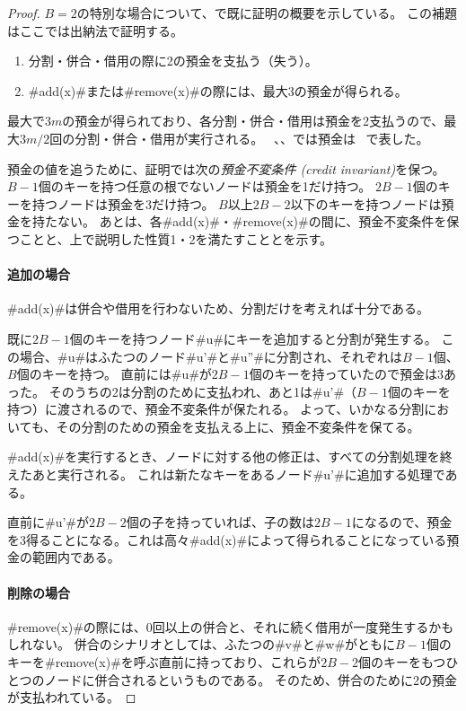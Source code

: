 \begin{proof}
   $B=2$の特別な場合について、で既に証明の概要を示している。
   この補題はここでは出納法で証明する。
  \begin{enumerate}
    \item 分割・併合・借用の際に2の預金を支払う（失う）。
    \item #add(x)#または#remove(x)#の際には、最大3の預金が得られる。
  \end{enumerate}
  最大で$3m$の預金が得られており、各分割・併合・借用は預金を2支払うので、最大$3m/2$回の分割・併合・借用が実行される。
  ~、、では預金は \cent\ で表した。

  預金の値を追うために、証明では次の\emph{預金不変条件 (credit invariant)}を保つ。
  $B-1$個のキーを持つ任意の根でないノードは預金を1だけ持つ。
  $2B-1$個のキーを持つノードは預金を3だけ持つ。
  $B$以上$2B-2$以下のキーを持つノードは預金を持たない。
  あとは、各#add(x)#・#remove(x)#の間に、預金不変条件を保つことと、上で説明した性質1・2を満たすこととを示す。

  \paragraph{追加の場合}
  #add(x)#は併合や借用を行わないため、分割だけを考えれば十分である。

  既に$2B-1$個のキーを持つノード#u#にキーを追加すると分割が発生する。
  この場合、#u#はふたつのノード#u'#と#u''#に分割され、それぞれは$B-1$個、$B$個のキーを持つ。
  直前には#u#が$2B-1$個のキーを持っていたので預金は3あった。
  そのうちの2は分割のために支払われ、あと1は#u'#（$B-1$個のキーを持つ）に渡されるので、預金不変条件が保たれる。
  よって、いかなる分割においても、その分割のための預金を支払える上に、預金不変条件を保てる。

  #add(x)#を実行するとき、ノードに対する他の修正は、すべての分割処理を終えたあと実行される。
  これは新たなキーをあるノード#u'#に追加する処理である。

  直前に#u'#が$2B-2$個の子を持っていれば、子の数は$2B-1$になるので、預金を3得ることになる。これは高々#add(x)#によって得られることになっている預金の範囲内である。

  \paragraph{削除の場合}
  #remove(x)#の際には、0回以上の併合と、それに続く借用が一度発生するかもしれない。
  併合のシナリオとしては、ふたつの#v#と#w#がともに$B-1$個のキーを#remove(x)#を呼ぶ直前に持っており、これらが$2B-2$個のキーをもつひとつのノードに併合されるというものである。
  そのため、併合のために2の預金が支払われている。


\end{proof}
